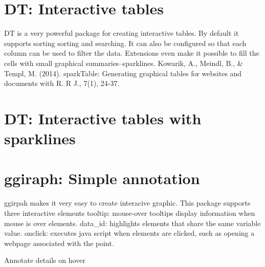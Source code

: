 \documentclass[]{krantz}
\makeatletter
\newenvironment{Shaded}{\begin{snugshade}}{\end{snugshade}}
\newcommand{\DataTypeTok}[1]{\textcolor[rgb]{0.13,0.29,0.53}{#1}}
\newcommand{\KeywordTok}[1]{\textcolor[rgb]{0.13,0.29,0.53}{\textbf{#1}}}
\newcommand{\NormalTok}[1]{#1}
\newcommand{\OperatorTok}[1]{\textcolor[rgb]{0.81,0.36,0.00}{\textbf{#1}}}
\newcommand{\StringTok}[1]{\textcolor[rgb]{0.31,0.60,0.02}{#1}}
\newenvironment{kframe}{%
\medskip{}
\setlength{\fboxsep}{.8em}
 \def\at@end@of@kframe{}%
 \ifinner\ifhmode%
  \def\at@end@of@kframe{\end{minipage}}%
  \begin{minipage}{\columnwidth}%
 \fi\fi%
 \def\FrameCommand##1{\hskip\@totalleftmargin \hskip-\fboxsep
 \colorbox{shadecolor}{##1}\hskip-\fboxsep
     \hskip-\linewidth \hskip-\@totalleftmargin \hskip\columnwidth}%
 \MakeFramed {\advance\hsize-\width
   \@totalleftmargin\z@ \linewidth\hsize
   \@setminipage}}%
 {\par\unskip\endMakeFramed%
 \at@end@of@kframe}
\renewenvironment{Shaded}{\begin{kframe}}{\end{kframe}}
\makeatother
\begin{document}
\hypertarget{dt-interactive-tables}{%
\section{DT: Interactive tables}\label{dt-interactive-tables}}

DT is a very powerful package for creating interactive tables. By default it supports sorting sorting and searching. It can also be configured so that each column can be used to filter the data. Extensions even make it possible to fill the cells with small graphical summaries--sparklines.
Kowarik, A., Meindl, B., \& Templ, M. (2014). sparkTable: Generating graphical tables for websites and documents with R. R J., 7(1), 24-37.

\begin{Shaded}
\end{Shaded}

\hypertarget{htmlwidget-d58b29d8106001298873}{}

\hypertarget{dt-interactive-tables-with-sparklines}{%
\section{DT: Interactive tables with sparklines}\label{dt-interactive-tables-with-sparklines}}

\hypertarget{htmlwidget-6751e7cfb2b355421ca6}{}

\hypertarget{ggiraph-simple-annotation}{%
\section{ggiraph: Simple annotation}\label{ggiraph-simple-annotation}}

ggirpah makes it very easy to create interacive graphic. This package supports three interactive elements
tooltip: mouse-over tooltips display information when mouse is over elements.
data\_id: highlights elements that share the same variable value.
onclick: executes java script when elements are clicked, such as opening a webpage associated with the point.

Annotate details on hover
\end{document}
